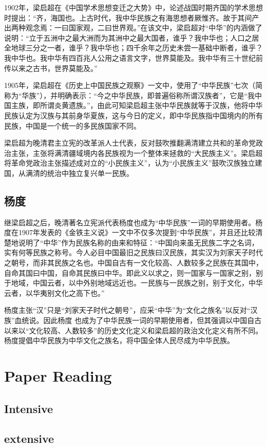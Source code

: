 \documentclass{sig-alternate-05-2015}
\begin{document}
1902年，梁启超在《中国学术思想变迁之大势》中，论述战国时期齐国的学术思想时提出：“齐，海国也。上古时代，我中华民族之有海思想者厥惟齐。故于其间产出两种观念焉：一曰国家观，二曰世界观。”在该文中，梁启超对“中华”的内涵做了说明：“立于五洲中之最大洲而为其洲中之最大国者，谁乎？我中华也；人口之居全地球三分之一者，谁乎？我中华也；四千余年之历史未尝一基础中断者，谁乎？我中华也。我中华有四百兆人公用之语言文字，世界莫能及。我中华有三十世纪前传以来之古书，世界莫能及。”

1905年，梁启超在《历史上中国民族之观察》一文中，使用了“中华民族”七次（简称为“华族”），并明确表示：“今之中华民族，即普遍俗称所谓汉族者”，它是“我中国主族，即所谓炎黄遗族。”，由此可知梁启超主张中华民族就等于汉族，他将中华民族认定为汉族与其前身华夏族，这与今日的定义，即中华民族指中国境内的所有民族，中国是一个统一的多民族国家不同。

梁启超为晚清君主立宪的改革派人士代表，反对鼓吹推翻满清建立共和的革命党政治主张，主张将满清疆域境内各民族视为一个整体来拯救的“大民族主义”。梁启超将革命党政治主张描述成对立的“小民族主义”，认为“小民族主义”鼓吹汉族独立建国，从满清的统治中独立复兴单一民族。

\subsection{杨度}
继梁启超之后，晚清著名立宪派代表杨度也成为“中华民族”一词的早期使用者。杨度在1907年发表的《金铁主义说》一文中不仅多次提到“中华民族”，并且还比较清楚地说明了“中华”作为民族名称的由来和特征：“中国向来虽无民族二字之名词，实有何等民族之称号。今人必目中国最旧之民族曰汉民族，其实汉为刘家天子时代之朝号，而非其民族之名也。中国自古有一文化较高、人数较多之民族在其国中，自命其国曰中国，自命其民族曰中华。即此义以求之，则一国家与一国家之别，别于地域，中国云者，以中外别地域远近也。一民族与一民族之别，别于文化，中华云者，以华夷别文化之高下也。”

杨度主张“汉”只是“刘家天子时代之朝号”，应采“中华”为“文化之族名”以反对“汉族”血统说。因此杨度 也成为了中华民族一词的早期使用者，但其强调以中国自古以来以“文化较高、人数较多”的历史文化定义和梁启超的政治文化定义有所不同。杨度提倡中华民族为中华文化之族名，将中国全体人民尽成为中华民族。





\section{Paper Reading}

	\subsection{Intensive}
		\cite{SWless}
		\cite{SurNfc}
		\cite{WTraMag}
		\cite{magP}
		\cite{pocketC}
		\cite{wirelessALL}
	\subsection{extensive}
        \cite{6176332}
        \cite{6838830}
        \cite{7056164}
        \cite{6902086}
        \cite{Fei:2013:PPP:2512349.2514593}
        \cite{7428884}
        \cite{4782856}
	
{\small
	
	
}
\end{document}
